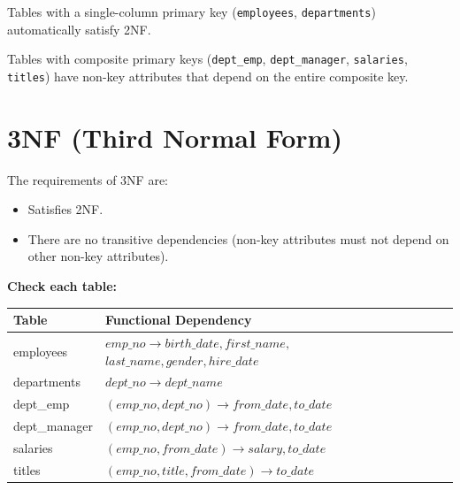 \documentclass[a4paper,12pt]{report}
\begin{document}
Tables with a single-column primary key
(\texttt{employees}, \texttt{departments}) automatically
satisfy 2NF.

Tables with composite primary keys
(\texttt{dept\_emp}, \texttt{dept\_manager},
\texttt{salaries}, \texttt{titles}) have non-key attributes
that depend on the entire composite key.


\section{3NF (Third Normal Form)}

The requirements of 3NF are:

\begin{itemize}
    \setlength{\itemsep}{3pt}
    \item Satisfies 2NF.
    \item There are no transitive dependencies (non-key
    attributes must not depend on other non-key attributes).
\end{itemize}

\noindent
\textbf{Check each table:}

\vspace{3pt}

\begin{center}
\renewcommand{\arraystretch}{1.4}
\begin{tabularx}{0.95\textwidth}{|l|X|}
    \hline
    \textbf{Table} & \textbf{Functional Dependency} \\
    \hline

    employees &
    $emp\_no \rightarrow birth\_date, first\_name,$
    \newline
    $last\_name, gender, hire\_date$ \\
    \hline

    departments &
    $dept\_no \rightarrow dept\_name$ \\
    \hline

    dept\_emp &
    $(emp\_no, dept\_no) \rightarrow from\_date, to\_date$ \\
    \hline

    dept\_manager &
    $(emp\_no, dept\_no) \rightarrow from\_date, to\_date$ \\
    \hline

    salaries &
    $(emp\_no, from\_date) \rightarrow salary, to\_date$ \\
    \hline

    titles &
    $(emp\_no, title, from\_date) \rightarrow to\_date$ \\
    \hline
\end{tabularx}
\end{center}
\end{document}
